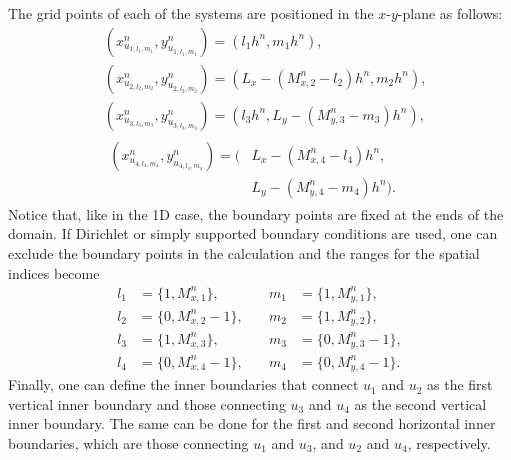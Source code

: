 \documentclass[fleqn]{jaes}
\begin{document}
The grid points of each of the systems are positioned in the $x$-$y$-plane as follows:%
\begin{subequations}
    \begin{align}
        &\!\!\!\left(x_{u_{1, l_1, m_1}}^n, y_{u_{1, l_1, m_1}}^n\right) = \left(l_1h^n, m_1h^n\right),\\
        &\!\!\!\left(x_{u_{2, l_2, m_2}}^n, y_{u_{2, l_2, m_2}}^n\right) =  \left(L_x-(M_{x,2}^n-l_2)h^n, m_2h^n\right),\\
        &\!\!\!\left(x_{u_{3, l_3, m_3}}^n, y_{u_{3, l_3, m_3}}^n\right) = \left(l_3h^n, L_y-(M_{y,3}^n-m_3)h^n\right),\\
        &\!\!\!\begin{aligned}\left(x_{u_{4, l_4, m_4}}^n, y_{u_{4, l_4, m_4}}^n\right) =
        \Big(&L_x-(M_{x,4}^n-l_4)h^n,\\ \qquad &L_y-(M_{y,4}^n-m_4)h^n\Big).\end{aligned}
    \end{align}
\end{subequations}
Notice that, like in the 1D case, the boundary points are fixed at the ends of the domain. If Dirichlet or simply supported boundary conditions are used, one can exclude the boundary points in the calculation and the ranges for the spatial indices become 
\begin{equation}\label{eq:rangesLM}
    \begin{aligned}
        l_1 &= \{1, M_{x,1}^n\}, &\quad m_1 &= \{1, M_{y,1}^n\}, \\
         l_2 &= \{0, M_{x,2}^n-1\}, &\quad m_2 &= \{1, M_{y,2}^n\},\\
        l_3 &= \{1, M_{x,3}^n\},&\quad m_3 &= \{0, M_{y,3}^n-1\},\\
        l_4 &= \{0, M_{x,4}^n-1\}, &\quad m_4 &= \{0, M_{y,4}^n-1\}.
    \end{aligned}
\end{equation}
Finally, one can define the inner boundaries that connect $u_1$ and $u_2$ as the first vertical inner boundary and those connecting $u_3$ and $u_4$ as the second vertical inner boundary. The same can be done for the first and second horizontal inner boundaries, which are those connecting $u_1$ and $u_3$, and $u_2$ and $u_4$, respectively. 
\end{document}
